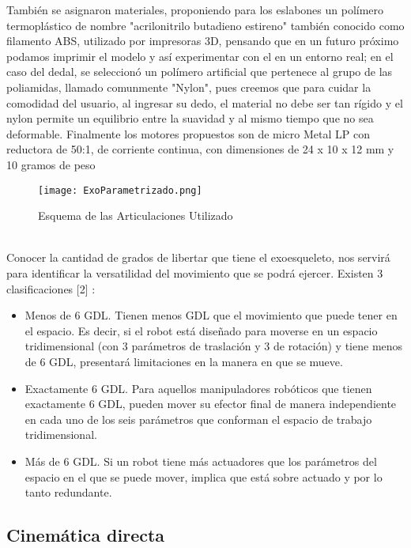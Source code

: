 \documentclass[journal]{IEEEtran}
\begin{document}
    También se asignaron materiales, proponiendo para los eslabones un polímero termoplástico de nombre "acrilonitrilo
    butadieno estireno" también conocido como filamento ABS, utilizado por impresoras 3D, pensando que en un futuro próximo
    podamos imprimir el modelo y así experimentar con el en un entorno real; en el caso del dedal, se seleccionó un polímero artificial que pertenece al grupo de las poliamidas, llamado comunmente "Nylon", pues creemos que para cuidar la comodidad del usuario, al ingresar su dedo, el material no debe ser tan rígido y el nylon permite un equilibrio entre la suavidad y al mismo tiempo que no sea deformable.
    Finalmente los motores propuestos son de micro Metal LP con reductora de 50:1, de corriente continua, con dimensiones
    de 24 x 10 x 12 mm y 10 gramos de peso \\ 
    \begin{figure} [h!]
                \centering
                \texttt{[image: ExoParametrizado.png]}
            \caption{Esquema de las Articulaciones Utilizado}
            \label{fig:ExoPara}
    \end{figure}
    \noindent  \\
    Conocer la cantidad de grados de libertar que tiene el exoesqueleto, nos servirá para identificar la versatilidad del
    movimiento que se podrá ejercer. Existen 3 clasificaciones [2] :
    \begin{itemize}
        \item Menos de 6 GDL. Tienen menos GDL que el movimiento que puede tener en el espacio. Es decir, si el robot está
        diseñado para moverse en un espacio tridimensional (con 3 parámetros de traslación y 3 de rotación) y tiene menos
        de 6 GDL, presentará  limitaciones en la manera en que se mueve. 
        \item Exactamente 6 GDL. Para aquellos manipuladores robóticos que tienen exactamente 6 GDL, pueden mover su efector
        final de manera independiente en cada uno de los seis parámetros que conforman el espacio de trabajo tridimensional.
        \item Más de 6 GDL. Si un robot tiene más actuadores que los parámetros del espacio en el que se puede mover,
        implica que está sobre actuado y por lo tanto redundante.
    \end{itemize}


    \subsection{Cinemática directa}
\end{document}
